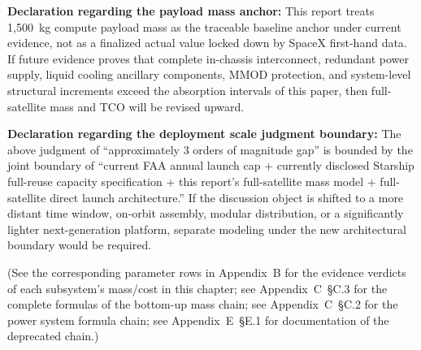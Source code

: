 \bigskip
\noindent\textbf{Declaration regarding the payload mass anchor:} This report treats 1,500~kg compute payload mass as the traceable baseline anchor under current evidence, not as a finalized actual value locked down by SpaceX first-hand data. If future evidence proves that complete in-chassis interconnect, redundant power supply, liquid cooling ancillary components, MMOD protection, and system-level structural increments exceed the absorption intervals of this paper, then full-satellite mass and TCO will be revised upward.

\bigskip
\noindent\textbf{Declaration regarding the deployment scale judgment boundary:} The above judgment of ``approximately 3 orders of magnitude gap'' is bounded by the joint boundary of ``current FAA annual launch cap + currently disclosed Starship full-reuse capacity specification + this report's full-satellite mass model + full-satellite direct launch architecture.'' If the discussion object is shifted to a more distant time window, on-orbit assembly, modular distribution, or a significantly lighter next-generation platform, separate modeling under the new architectural boundary would be required.

(See the corresponding parameter rows in Appendix~B for the evidence verdicts of each subsystem's mass/cost in this chapter; see Appendix~C~\S C.3 for the complete formulas of the bottom-up mass chain; see Appendix~C~\S C.2 for the power system formula chain; see Appendix~E~\S E.1 for documentation of the deprecated chain.)

\endinput
